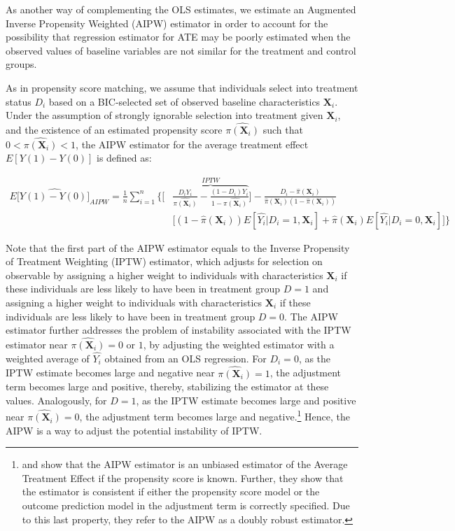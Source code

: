 As another way of complementing the OLS estimates, we estimate an Augmented Inverse Propensity Weighted (AIPW) estimator in order to account for the possibility that regression estimator for ATE may be poorly estimated when the observed values of baseline variables are not similar for the treatment and control groups.

As in propensity score matching, we assume that individuals select into treatment status $D_i$ based on a BIC-selected set of observed baseline characteristics $\boldsymbol{X}_i$. Under the assumption of strongly ignorable selection into treatment given $\boldsymbol{X}_i$, and the existence of an estimated propensity score $\hat{\pi({\boldsymbol{X}_i})}$ such that $0<\hat{\pi({\boldsymbol{X}_i})}<1$, the AIPW estimator for the average treatment effect $E[Y(1)-Y(0)]$ is defined as:

\begin{align}\label{eq:AIPW}
E[\widehat{Y(1)-Y(0)]}_{AIPW} = \frac{1}{n} \sum_{i=1}^{n} \bigg \{ \bigg[ & \overbrace{\frac{D_i Y_i}{\hat{\pi(\boldsymbol{X}_i)}} - \frac{(1-D_i)Y_i}{1-\hat{\pi(\boldsymbol{X}_i)}}}^{IPTW} \bigg]- \frac{D_i - \hat{\pi}(\boldsymbol{X}_i)}{\hat{\pi}(\boldsymbol{X}_i) (1-\hat{\pi}(\boldsymbol{X}_i))} \nonumber \\[10pt]
& \bigg[ (1-\hat{\pi}(\boldsymbol{X}_i)) E[\hat{Y_i}|D_i=1,\boldsymbol{X}_i] + \hat{\pi}(\boldsymbol{X}_i) E[\hat{Y_i}|D_i=0,\boldsymbol{X}_i] \bigg] \bigg \}
\end{align}

Note that the first part of the AIPW estimator equals to the Inverse Propensity of Treatment Weighting (IPTW) estimator, which adjusts for selection on observable by assigning a higher weight to individuals with characteristics $\boldsymbol{X}_i$ if these individuals are less likely to have been in treatment group $D = 1$ and assigning a higher weight to individuals with characteristics $\boldsymbol{X}_i$ if these individuals are less likely to have been in treatment group $D = 0$. The AIPW estimator further addresses the problem of instability associated with the IPTW estimator near $\hat{\pi(\boldsymbol{X}_i)} = 0$ or $1$, by adjusting the weighted estimator with a weighted average of $\hat{Y_i}$ obtained from an OLS regression. For $D_i = 0$, as the IPTW estimate becomes large and negative near $\hat{\pi(\boldsymbol{X}_i)} = 1$, the adjustment term becomes large and positive, thereby, stabilizing the estimator at these values. Analogously, for $D = 1$, as the IPTW estimate becomes large and positive near $\hat{\pi(\boldsymbol{X}_i)} = 0$, the adjustment term becomes large and negative.\footnote{\citet{Tsiatis_2006_Semiparametric-Theory} and \citet{Glynn-Quinn_2010_Political-Analysis} show that the AIPW estimator is an unbiased estimator of the Average Treatment Effect if the propensity score is known. Further, they show that the estimator is consistent if either the propensity score model or the outcome prediction model in the adjustment term is correctly specified. Due to this last property, they refer to the AIPW as a doubly robust estimator.}  Hence, the AIPW is a way to adjust the potential instability of IPTW.


